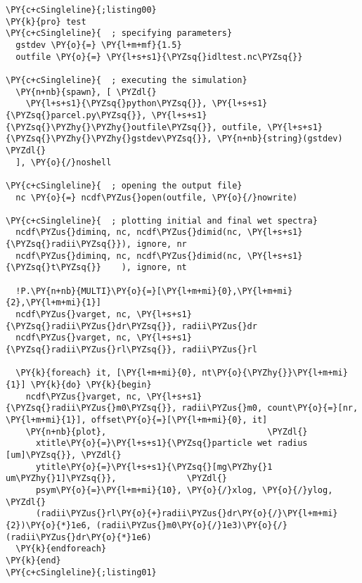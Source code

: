\begin{Verbatim}[commandchars=\\\{\}]
\PY{c+cSingleline}{;listing00}
\PY{k}{pro} test 
\PY{c+cSingleline}{  ; specifying parameters}
  gstdev \PY{o}{=} \PY{l+m+mf}{1.5}
  outfile \PY{o}{=} \PY{l+s+s1}{\PYZsq{}idltest.nc\PYZsq{}}

\PY{c+cSingleline}{  ; executing the simulation}
  \PY{n+nb}{spawn}, [ \PYZdl{}
    \PY{l+s+s1}{\PYZsq{}python\PYZsq{}}, \PY{l+s+s1}{\PYZsq{}parcel.py\PYZsq{}}, \PY{l+s+s1}{\PYZsq{}\PYZhy{}\PYZhy{}outfile\PYZsq{}}, outfile, \PY{l+s+s1}{\PYZsq{}\PYZhy{}\PYZhy{}gstdev\PYZsq{}}, \PY{n+nb}{string}(gstdev) \PYZdl{}
  ], \PY{o}{/}noshell

\PY{c+cSingleline}{  ; opening the output file}
  nc \PY{o}{=} ncdf\PYZus{}open(outfile, \PY{o}{/}nowrite)

\PY{c+cSingleline}{  ; plotting initial and final wet spectra}
  ncdf\PYZus{}diminq, nc, ncdf\PYZus{}dimid(nc, \PY{l+s+s1}{\PYZsq{}radii\PYZsq{}}), ignore, nr
  ncdf\PYZus{}diminq, nc, ncdf\PYZus{}dimid(nc, \PY{l+s+s1}{\PYZsq{}t\PYZsq{}}    ), ignore, nt

  !P.\PY{n+nb}{MULTI}\PY{o}{=}[\PY{l+m+mi}{0},\PY{l+m+mi}{2},\PY{l+m+mi}{1}]
  ncdf\PYZus{}varget, nc, \PY{l+s+s1}{\PYZsq{}radii\PYZus{}dr\PYZsq{}}, radii\PYZus{}dr
  ncdf\PYZus{}varget, nc, \PY{l+s+s1}{\PYZsq{}radii\PYZus{}rl\PYZsq{}}, radii\PYZus{}rl
 
  \PY{k}{foreach} it, [\PY{l+m+mi}{0}, nt\PY{o}{\PYZhy{}}\PY{l+m+mi}{1}] \PY{k}{do} \PY{k}{begin}
    ncdf\PYZus{}varget, nc, \PY{l+s+s1}{\PYZsq{}radii\PYZus{}m0\PYZsq{}}, radii\PYZus{}m0, count\PY{o}{=}[nr, \PY{l+m+mi}{1}], offset\PY{o}{=}[\PY{l+m+mi}{0}, it]
    \PY{n+nb}{plot},                                \PYZdl{}
      xtitle\PY{o}{=}\PY{l+s+s1}{\PYZsq{}particle wet radius [um]\PYZsq{}}, \PYZdl{}
      ytitle\PY{o}{=}\PY{l+s+s1}{\PYZsq{}[mg\PYZhy{}1 um\PYZhy{}1]\PYZsq{}},              \PYZdl{}
      psym\PY{o}{=}\PY{l+m+mi}{10}, \PY{o}{/}xlog, \PY{o}{/}ylog,             \PYZdl{}
      (radii\PYZus{}rl\PY{o}{+}radii\PYZus{}dr\PY{o}{/}\PY{l+m+mi}{2})\PY{o}{*}1e6, (radii\PYZus{}m0\PY{o}{/}1e3)\PY{o}{/}(radii\PYZus{}dr\PY{o}{*}1e6)
  \PY{k}{endforeach}
\PY{k}{end}
\PY{c+cSingleline}{;listing01}
\end{Verbatim}

